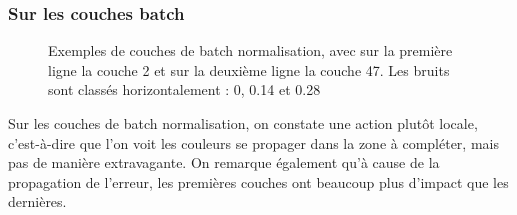 \documentclass[12pt]{article}
\begin{document}
\subsubsection*{Sur les couches batch}
\begin{figure}[htb]
\centering
  \hfill
  \hfill
  \hfill
  \hfill
\end{figure}
\begin{figure}[htb]
\centering
  \hfill
  \hfill
  \hfill
  \hfill
  \caption{Exemples de couches de batch normalisation, avec sur la première ligne la couche 2 et sur la deuxième ligne la couche 47. Les bruits sont classés horizontalement : 0, 0.14 et 0.28}\label{fig:occlus_dynamic}
\end{figure}

Sur les couches de batch normalisation, on constate une action plutôt locale, c'est-à-dire que l'on voit les couleurs se propager dans la zone à compléter, mais pas de manière extravagante. On remarque également qu'à cause de la propagation de l'erreur, les premières couches ont beaucoup plus d'impact que les dernières.

\newpage
\end{document}

